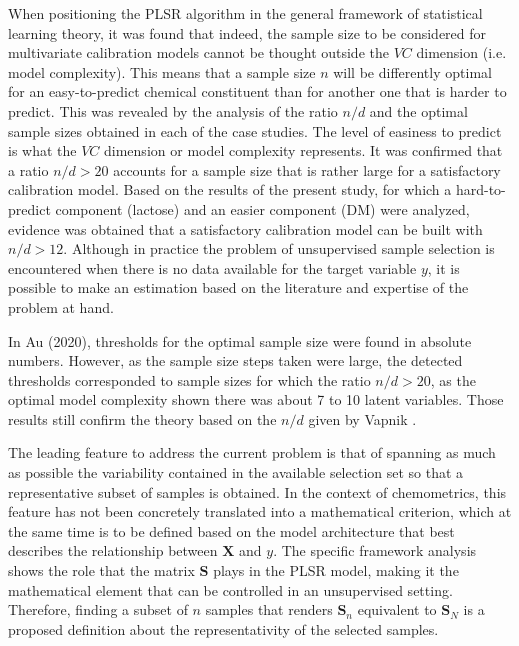 \documentclass[journal=ancham,manuscript=article]{achemso}
\begin{document}
When positioning the PLSR algorithm in the general framework of statistical learning theory, it was found that indeed, the sample size to be considered for multivariate calibration models cannot be thought outside the $VC$ dimension (i.e. model complexity). This means that a sample size $n$ will be differently optimal for an easy-to-predict chemical constituent than for another one that is harder to predict. This was revealed by the analysis of the ratio $n/d$ and the optimal sample sizes obtained in each of the case studies. The level of easiness to predict is what the $VC$ dimension or model complexity represents. It was confirmed that a ratio $n/d>20$ accounts for a sample size that is rather large for a satisfactory calibration model. Based on the results of the present study, for which a hard-to-predict component (lactose) and an easier component (DM) were analyzed, evidence was obtained that a satisfactory calibration model can be built with $n/d>12$. Although in practice the problem of unsupervised sample selection is encountered when there is no data available for the target variable $y$, it is possible to make an estimation based on the literature and expertise of the problem at hand.

In Au (2020)\cite{Au2020}, thresholds for the optimal sample size were found in absolute numbers. However, as the sample size steps taken were large, the detected thresholds corresponded to sample sizes for which the ratio $n/d>20$, as the optimal model complexity shown there was about 7 to 10 latent variables. Those results still confirm the theory based on the $n/d$ given by Vapnik \cite{Vapnik2000}.

The leading feature to address the current problem is that of spanning as much as possible the variability contained in the available selection set so that a representative subset of samples is obtained. In the context of chemometrics, this feature has not been concretely translated into a mathematical criterion, which at the same time is to be defined based on the model architecture that best describes the relationship between $\mathbf{X}$ and $y$. The specific framework analysis shows the role that the matrix $\mathbf{S}$ plays in the PLSR model, making it the mathematical element that can be controlled in an unsupervised setting. Therefore, finding a subset of $n$ samples that renders $\mathbf{S}_n$ equivalent to $\mathbf{S}_N$ is a proposed definition about the representativity of the selected samples. 
\end{document}
